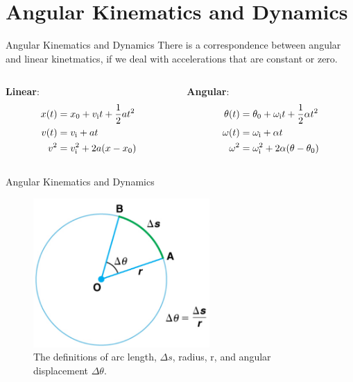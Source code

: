 \documentclass{beamer}
\begin{document}
\section{Angular Kinematics and Dynamics}

\begin{frame}{Angular Kinematics and Dynamics}
There is a correspondence between \alert{angular and linear kinetmatics}, if we deal with accelerations that are constant or zero.
\begin{columns}[T]
\begin{column}{0.5\textwidth}
\centering
\textbf{Linear}:
\begin{align}
x(t) &= x_{\rm 0} + v_{\rm i}t + \frac{1}{2}at^2 \\
v(t) &= v_{\rm i} + at \\
v^2 &= v_{\rm i}^2 + 2a(x-x_{\rm 0})
\end{align}
\end{column}
\begin{column}{0.5\textwidth}
\centering
\textbf{Angular}:
\begin{align}
\theta(t) &= \theta_{\rm 0} + \omega_{\rm i}t + \frac{1}{2}\alpha t^2 \\
\omega(t) &= \omega_{\rm i} + \alpha t \\
\omega^2 &= \omega_{\rm i}^2 + 2\alpha(\theta-\theta_{\rm 0})
\end{align}
\end{column}
\end{columns}
\end{frame}

\begin{frame}{Angular Kinematics and Dynamics}
\begin{figure}
\centering
\includegraphics[width=0.6\textwidth]{figures/circle1.png}
\caption{\label{fig:circle1} The definitions of arc length, $\Delta s$, radius, r, and angular displacement $\Delta\theta$.}
\end{figure}
\end{frame}
\end{document}

